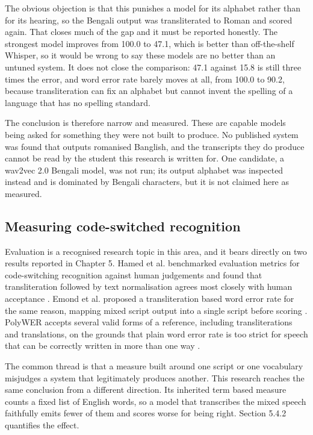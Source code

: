 The obvious objection is that this punishes a model for its alphabet rather than for its
hearing, so the Bengali output was transliterated to Roman and scored again. That closes
much of the gap and it must be reported honestly. The strongest model improves from 100.0
to 47.1, which is better than off-the-shelf Whisper, so it would be wrong to say these
models are no better than an untuned system. It does not close the comparison: 47.1
against 15.8 is still three times the error, and word error rate barely moves at all,
from 100.0 to 90.2, because transliteration can fix an alphabet but cannot invent the
spelling of a language that has no spelling standard.

The conclusion is therefore narrow and measured. These are capable models being asked for
something they were not built to produce. No published system was found that outputs
romanised Banglish, and the transcripts they do produce cannot be read by the student this
research is written for. One candidate, a wav2vec 2.0 Bengali model, was not run; its output
alphabet was inspected instead and is dominated by Bengali characters, but it is not
claimed here as measured.

\subsection{Measuring code-switched recognition}
\label{sec:cs-metrics}

Evaluation is a recognised research topic in this area, and it bears directly on two
results reported in Chapter 5. Hamed et al. benchmarked evaluation metrics for
code-switching recognition against human judgements and found that transliteration
followed by text normalisation agrees most closely with human acceptance
\cite{hamed2022benchmarking}. Emond et al. proposed a transliteration based word error
rate for the same reason, mapping mixed script output into a single script before scoring
\cite{emond2018transliteration}. PolyWER accepts several valid forms of a reference,
including transliterations and translations, on the grounds that plain word error rate is
too strict for speech that can be correctly written in more than one way
\cite{kadaoui2024polywer}.

The common thread is that a measure built around one script or one vocabulary misjudges a
system that legitimately produces another. This research reaches the same conclusion from a
different direction. Its inherited term based measure counts a fixed list of English
words, so a model that transcribes the mixed speech faithfully emits fewer of them and
scores worse for being right. Section 5.4.2 quantifies the effect.

